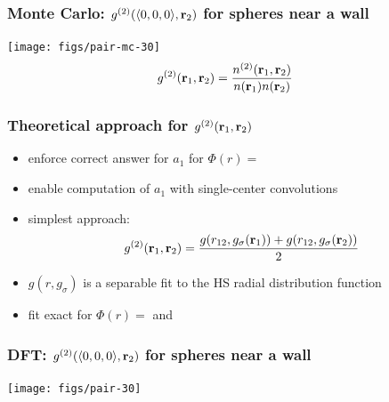 \begin{frame}
  \frametitle{Monte Carlo: $g^{(2)}(\langle 0,0,0\rangle,\mathbf{r}_2)$ for spheres near a wall}
  \texttt{[image: figs/pair-mc-30]}
  \begin{align*}
    g^{(2)}(\mathbf{r}_1,\mathbf{r}_2) &= \frac{n^{(2)}(\mathbf{r}_1,\mathbf{r}_2)}{n(\mathbf{r}_1)n(\mathbf{r}_2)}
  \end{align*}
\end{frame}

\begin{frame}
  \frametitle{Theoretical approach for $g^{(2)}(\mathbf{r}_1,\mathbf{r}_2)$}
  \begin{block}{}
    \begin{itemize}
    \item enforce correct answer for $a_1$ for $\Phi(r) =$
    \item enable computation of $a_1$ with single-center convolutions
    \item simplest approach:
      \begin{equation*}
        g^{(2)}(\mathbf{r}_1,\mathbf{r}_2) = \frac{g(r_{12}, g_\sigma(\mathbf{r}_1)) +
          g(r_{12}, g_\sigma(\mathbf{r}_2))}{2}
      \end{equation*}
    \item $g(r,g_\sigma)$ is a separable fit to the HS radial
      distribution function
    \item fit exact for $\Phi(r)=$
      and
    \end{itemize}
  \end{block}
\end{frame}

\begin{frame}
  \frametitle{DFT: $g^{(2)}(\langle 0,0,0\rangle,\mathbf{r}_2)$ for spheres near a wall}
  \texttt{[image: figs/pair-30]}
\end{frame}

